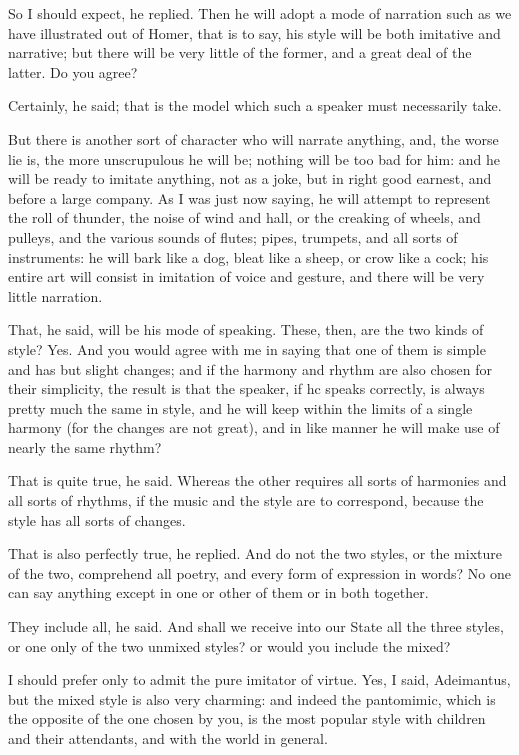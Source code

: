 So I should expect, he replied.
Then he will adopt a mode of narration such as we have illustrated out of Homer, that is to say, his style will be both imitative and narrative; but there will be very little of the former, and a great deal of the latter. Do you agree?

Certainly, he said; that is the model which such a speaker must necessarily take.

But there is another sort of character who will narrate anything, and, the worse lie is, the more unscrupulous he will be; nothing will be too bad for him: and he will be ready to imitate anything, not as a joke, but in right good earnest, and before a large company. As I was just now saying, he will attempt to represent the roll of thunder, the noise of wind and hall, or the creaking of wheels, and pulleys, and the various sounds of flutes; pipes, trumpets, and all sorts of instruments: he will bark like a dog, bleat like a sheep, or crow like a cock; his entire art will consist in imitation of voice and gesture, and there will be very little narration.

That, he said, will be his mode of speaking.
These, then, are the two kinds of style?
Yes.
And you would agree with me in saying that one of them is simple and has but slight changes; and if the harmony and rhythm are also chosen for their simplicity, the result is that the speaker, if hc speaks correctly, is always pretty much the same in style, and he will keep within the limits of a single harmony (for the changes are not great), and in like manner he will make use of nearly the same rhythm?

That is quite true, he said.
Whereas the other requires all sorts of harmonies and all sorts of rhythms, if the music and the style are to correspond, because the style has all sorts of changes.

That is also perfectly true, he replied.
And do not the two styles, or the mixture of the two, comprehend all poetry, and every form of expression in words? No one can say anything except in one or other of them or in both together.

They include all, he said.
And shall we receive into our State all the three styles, or one only of the two unmixed styles? or would you include the mixed?

I should prefer only to admit the pure imitator of virtue.
Yes, I said, Adeimantus, but the mixed style is also very charming: and indeed the pantomimic, which is the opposite of the one chosen by you, is the most popular style with children and their attendants, and with the world in general.

